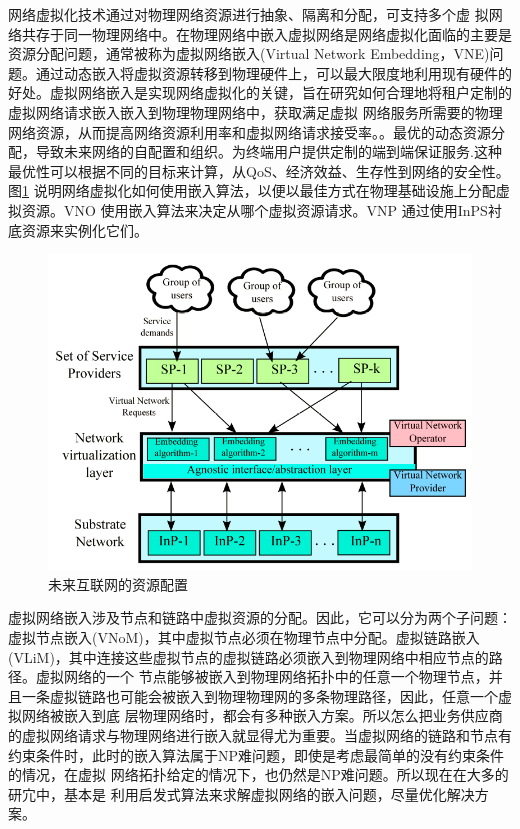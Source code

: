 网络虚拟化技术通过对物理网络资源进行抽象、隔离和分配，可支持多个虚 拟网络共存于同一物理网络中。在物理网络中嵌入虚拟网络是网络虚拟化面临的主要是资源分配问题，通常被称为虚拟网络嵌入(Virtual Network Embedding，VNE)问题。通过动态嵌入将虚拟资源转移到物理硬件上，可以最大限度地利用现有硬件的好处。虚拟网络嵌入是实现网络虚拟化的关键，旨在研究如何合理地将租户定制的虚拟网络请求嵌入嵌入到物理物理网络中，获取满足虚拟 网络服务所需要的物理网络资源，从而提高网络资源利用率和虚拟网络请求接受率。。最优的动态资源分配，导致未来网络的自配置和组织。为终端用户提供定制的端到端保证服务.这种最优性可以根据不同的目标来计算，从QoS、经济效益、生存性到网络的安全性。图\ref{fig:ResourceAllocationInFutureInternet} 说明网络虚拟化如何使用嵌入算法，以便以最佳方式在物理基础设施上分配虚拟资源。VNO 使用嵌入算法来决定从哪个虚拟资源请求。VNP 通过使用InPS衬底资源来实例化它们。
\begin{figure}[htbp]
\centering
\includegraphics[width=5.0in]{figures/ResourceAllocationInFutureInternet}
  \caption{未来互联网的资源配置}
  \label{fig:ResourceAllocationInFutureInternet}
\end{figure}

虚拟网络嵌入涉及节点和链路中虚拟资源的分配。因此，它可以分为两个子问题：虚拟节点嵌入(VNoM)，其中虚拟节点必须在物理节点中分配。虚拟链路嵌入(VLiM)，其中连接这些虚拟节点的虚拟链路必须嵌入到物理网络中相应节点的路径。虚拟网络的一个 节点能够被嵌入到物理网络拓扑中的任意一个物理节点，并且一条虚拟链路也可能会被嵌入到物理物理网的多条物理路径，因此，任意一个虚拟网络被嵌入到底 层物理网络时，都会有多种嵌入方案。所以怎么把业务供应商的虚拟网络请求与物理网络进行嵌入就显得尤为重要。当虚拟网络的链路和节点有约束条件时，此时的嵌入算法属于NP难问题\cite{amaldi2016computational}，即使是考虑最简单的没有约束条件的情况，在虚拟 网络拓扑给定的情况下，也仍然是NP难问题\cite{amaldi2016computational}。所以现在在大多的研宂中，基本是 利用启发式算法来求解虚拟网络的嵌入问题，尽量优化解决方案。



